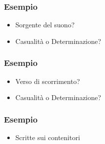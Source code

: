 \documentclass[compress,xcolor=dvipsnames]{beamer}
\begin{document}
\begin{frame}
	\frametitle{Esempio }

	\begin{center}
	\href{run:\exampledir/33bis-A05@9,5.aup}
  {}
	\end{center}

	\begin{itemize}%

		\item Sorgente del suono?

		\item Casualit\`a o Determinazione?

	\end{itemize}

\end{frame}

\begin{frame}
	\frametitle{Esempio }

	\begin{center}
	\href{run:\exampledir/NMGS078-591-A10+A11-B06+B07.aup}
  {}
	\end{center}

	\begin{itemize}%

		\item Verso di scorrimento?

		\item Casualit\`a o Determinazione?

	\end{itemize}

\end{frame}

\begin{frame}
	\frametitle{Esempio }

	\begin{center}
	\end{center}

	\begin{itemize}

		\item Scritte sui contenitori

	\end{itemize}

\end{frame}
\end{document}

